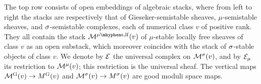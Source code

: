 \documentclass[letterpaper,11pt]{amsart}%
\theoremstyle{remark}
\begin{document}
\begin{center}
\end{center}
The top row consists of open embeddings of algebraic stacks, where from left to right the stacks are respectively that of Gieseker-semistable sheaves, $\mu$-semistable sheaves, and $\sigma$-semistable complexes, each of numerical class $v$ of positive rank. They all contain the stack $\sM^{\mu\mhyphen\mathrm{s}, \mathrm{lf}}(v)$ of $\mu$-stable locally free sheaves of class $v$ as an open substack, which moreover coincides with the stack of $\sigma$-stable objects of class $v$. We denote by $\mathcal{E}$ the universal complex on $\mathcal{M}^\sigma(v)$, and by $\mathcal{E}_\mu$ its restriction to $\mathcal{M}^{\mu}(v)$; this restriction is the universal sheaf. The vertical maps $\mathcal{M}^{\mathrm{G}}(v) \to M^{\mathrm{G}}(v)$ and $\mathcal{M}^\sigma(v) \to M^\sigma(v)$ are good moduli space maps.
\end{document}
